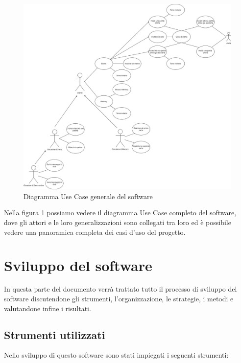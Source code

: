 \documentclass[12pt]{article}
\begin{document}
\begin{figure}[H]
\centering
\includegraphics[scale=.3]{UseCaseGeneral}
\caption{Diagramma Use Case generale del software}
\label{img:usecasegeneral}
\end{figure}

Nella figura \ref{img:usecasegeneral} possiamo vedere il diagramma Use Case completo del software, dove gli attori e le loro generalizzazioni sono collegati tra loro ed è possibile vedere una panoramica completa dei casi d'uso del progetto.

\section{Sviluppo del software}
In questa parte del documento verrà trattato tutto il processo di sviluppo del software discutendone gli strumenti, l'organizzazione, le strategie, i metodi e valutandone infine i risultati.

\subsection{Strumenti utilizzati}
Nello sviluppo di questo software sono stati impiegati i seguenti strumenti:
\end{document}

